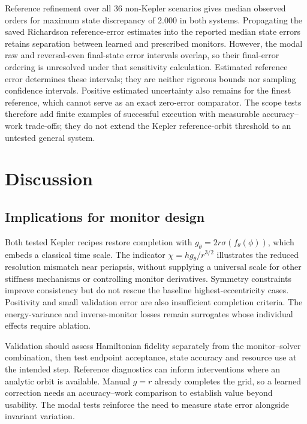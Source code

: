 \documentclass[final,3p,times]{elsarticle}
\begin{document}
Reference refinement over all 36 non-Kepler scenarios gives median
observed orders for maximum state discrepancy of 2.000 in both systems.
Propagating the saved Richardson reference-error estimates into the
reported median state errors retains separation between learned and
prescribed monitors. However, the modal raw and reversal-even final-state
error intervals overlap, so their final-error ordering is unresolved
under that sensitivity calculation. Estimated reference error determines these
intervals; they are neither rigorous bounds nor sampling confidence
intervals. Positive estimated uncertainty also remains for the finest
reference, which cannot serve as an exact zero-error comparator. The scope tests therefore add finite
examples of successful execution with measurable accuracy--work
trade-offs; they do not extend the Kepler reference-orbit threshold to
an untested general system.


\section{Discussion}
\label{sec:discussion}
\subsection{Implications for monitor design}
\label{sec:design-implications}

Both tested Kepler recipes restore completion with
$g_\theta=2r\sigma(f_\theta(\phi))$, which embeds a classical time scale.
The indicator $\chi=hg_\theta/r^{3/2}$ illustrates the reduced resolution
mismatch near periapsis, without supplying a universal scale for other
stiffness mechanisms or controlling monitor derivatives. Symmetry
constraints improve consistency but do not rescue the baseline
highest-eccentricity cases. Positivity and small validation error are also
insufficient completion criteria. The energy-variance and inverse-monitor
losses remain surrogates whose individual effects require ablation.

Validation should assess Hamiltonian fidelity separately from the
monitor--solver combination, then test endpoint acceptance, state accuracy
and resource use at the intended step. Reference diagnostics can inform
interventions where an analytic orbit is available. Manual $g=r$ already
completes the grid, so a learned correction needs an accuracy--work
comparison to establish value beyond usability. The modal tests reinforce
the need to measure state error alongside invariant variation.
\end{document}
